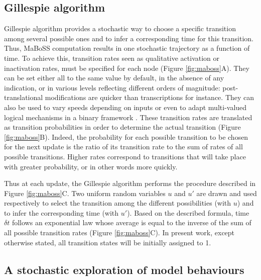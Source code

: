 \documentclass[a4paper,12pt,twoside,onecolumn,openright,final,oldfontcommands]{memoir}
\begin{document}
\subsection{Gillespie algorithm}\label{gillespie-algorithm}

Gillespie algorithm provides a stochastic way to choose a specific
transition among several possible ones and to infer a corresponding time
for this transition. Thus, MaBoSS computation results in one stochastic
trajectory as a function of time. To achieve this, transition rates seen
as qualitative activation or inactivation rates, must be specified for
each node (Figure \ref{fig:maboss}A). They can be set either all to the
same value by default, in the absence of any indication, or in various
levels reflecting different orders of magnitude: post-translational
modifications are quicker than transcriptions for instance. They can
also be used to vary speeds depending on inputs or even to adapt
multi-valued logical mechanisms in a binary framework
\citep{stoll2012continuous}. These transition rates are translated as
transition probabilities in order to determine the actual transition
(Figure \ref{fig:maboss}B). Indeed, the probability for each possible
transition to be chosen for the next update is the ratio of its
transition rate to the sum of rates of all possible transitions. Higher
rates correspond to transitions that will take place with greater
probability, or in other words more quickly.

Thus at each update, the Gillespie algorithm performs the procedure
described in Figure \ref{fig:maboss}C. Two uniform random variables
\(u\) and \(u'\) are drawn and used respectively to select the
transition among the different possibilities (with \(u\)) and to infer
the corresponding time (with \(u'\)). Based on the described formula,
time \(\delta t\) follows an exponential law whose average is equal to
the inverse of the sum of all possible transition rates (Figure
\ref{fig:maboss}C). In present work, except otherwise stated, all
transition states will be initially assigned to 1.

\subsection{A stochastic exploration of model
behaviours}\label{a-stochastic-exploration-of-model-behaviours}
\end{document}
